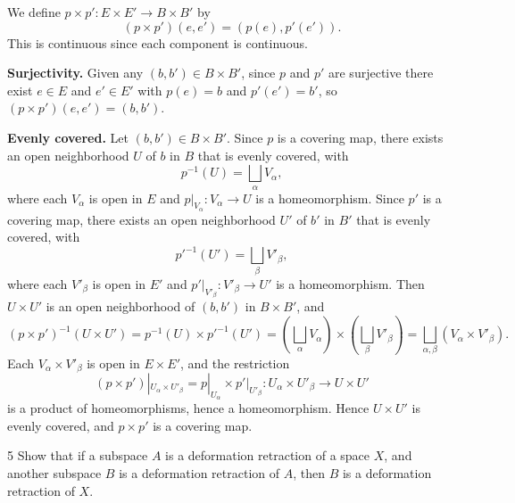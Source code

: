 \documentclass[12pt]{article}
\begin{document}
\begin{solution}
    \bbni

    We define $p \times p' : E \times E' \to B \times B'$ by
    \[
        (p \times p')(e, e') = (p(e), p'(e')).
    \]
    This is continuous since each component is continuous.

    \textbf{Surjectivity.} Given any $(b, b') \in B \times B'$, since $p$
    and $p'$ are surjective there exist $e \in E$ and $e' \in E'$ with
    $p(e) = b$ and $p'(e') = b'$, so $(p \times p')(e,e') = (b,b')$.

    \textbf{Evenly covered.} Let $(b, b') \in B \times B'$. Since $p$ is a
    covering map, there exists an open neighborhood $U$ of $b$ in $B$ that
    is evenly covered, with
    \[
        p^{-1}(U) = \bigsqcup_{\alpha} V_\alpha,
    \]
    where each $V_\alpha$ is open in $E$ and $p|_{V_\alpha} : V_\alpha
    \to U$ is a homeomorphism. Since $p'$ is a covering map, there exists
    an open neighborhood $U'$ of $b'$ in $B'$ that is evenly covered, with
    \[
        p'^{-1}(U') = \bigsqcup_{\beta} V'_\beta,
    \]
    where each $V'_\beta$ is open in $E'$ and $p'|_{V'_\beta} : V'_\beta \to U'$ is a homeomorphism. Then $U \times U'$ is an open neighborhood of $(b,b')$ in $B \times B'$, and
    \[
        (p \times p')^{-1}(U \times U')
        = p^{-1}(U) \times p'^{-1}(U')
        = \left(\bigsqcup_\alpha V_\alpha\right) \times
          \left(\bigsqcup_\beta V'_\beta\right)
        = \bigsqcup_{\alpha,\beta} (V_\alpha \times V'_\beta).
    \]
    Each $V_\alpha \times V'_\beta$ is open in $E \times E'$, and the restriction
    \[
        (p \times p')|_{U_\alpha \times U'_\beta}
        = p|_{U_\alpha} \times p'|_{U'_\beta}
        : U_\alpha \times U'_\beta \to U \times U'
    \]
    is a product of homeomorphisms, hence a homeomorphism. Hence $U \times U'$ is evenly covered, and $p \times p'$ is a covering map.
\end{solution}

\newpage 

\begin{problem}{5}
    Show that if a subspace $A$ is a deformation retraction of a space $X$, and another subspace $B$ is a deformation retraction of $A$, then $B$ is a deformation retraction of $X$.
\end{problem}
\end{document}
